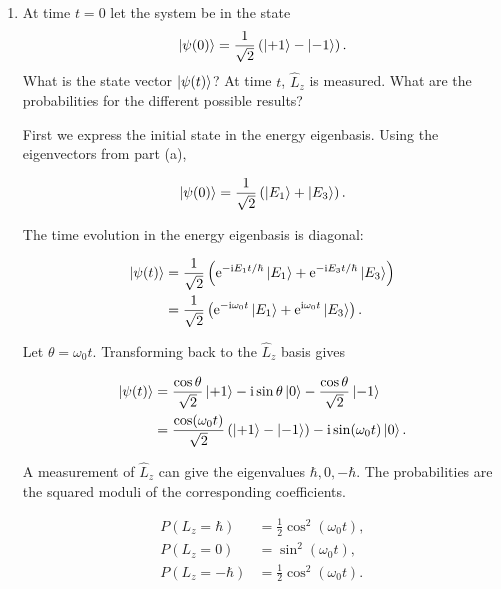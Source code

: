\documentclass[11pt,a4paper]{scrartcl}
\newcommand{\ii}{\mathrm{i}}
\newcommand{\e}{\mathrm{e}}
\newcommand{\op}[1]{\hat{#1}}
\begin{document}
\begin{enumerate}[label=(\alph*)]
        \item At time $t=0$ let the system be in the state
        \[
            \ket{\psi(0)}=\frac{1}{\sqrt{2}}\left(\ket{+1}-\ket{-1}\right).
        \]
        What is the state vector $\ket{\psi(t)}$? At time $t$, $\op{L}_z$ is measured. What are the probabilities for the different possible results?

        \begin{calculationbox}
            First we express the initial state in the energy eigenbasis. Using the eigenvectors from part (a),
            \begin{calculationbox}
                \[
                    \ket{\psi(0)}
                    =\frac{1}{\sqrt{2}}\left(\ket{E_1}+\ket{E_3}\right).
                \]
            \end{calculationbox}
            The time evolution in the energy eigenbasis is diagonal:
            \begin{calculationbox}
                \begin{align*}
                    \ket{\psi(t)}
                    &=\frac{1}{\sqrt{2}}
                    \left(\e^{-\ii E_1t/\hbar}\ket{E_1}
                    +\e^{-\ii E_3t/\hbar}\ket{E_3}\right) \\
                    &=\frac{1}{\sqrt{2}}
                    \left(\e^{-\ii\omega_0t}\ket{E_1}
                    +\e^{\ii\omega_0t}\ket{E_3}\right).
                \end{align*}
            \end{calculationbox}
            Let $\theta=\omega_0t$. Transforming back to the $\op{L}_z$ basis gives
            \begin{calculationbox}
                \begin{align*}
                    \ket{\psi(t)}
                    &=\frac{\cos\theta}{\sqrt{2}}\ket{+1}
                    -\ii\sin\theta\ket{0}
                    -\frac{\cos\theta}{\sqrt{2}}\ket{-1} \\
                    &=\frac{\cos(\omega_0t)}{\sqrt{2}}\left(\ket{+1}-\ket{-1}\right)
                    -\ii\sin(\omega_0t)\ket{0}.
                \end{align*}
            \end{calculationbox}
            A measurement of $\op{L}_z$ can give the eigenvalues $\hbar,0,-\hbar$. The probabilities are the squared moduli of the corresponding coefficients.
            \begin{calculationbox}
                \begin{align*}
                    P(L_z=\hbar) &= \frac12\cos^2(\omega_0t),\\
                    P(L_z=0) &= \sin^2(\omega_0t),\\
                    P(L_z=-\hbar) &= \frac12\cos^2(\omega_0t).
                \end{align*}
            \end{calculationbox}
        \end{calculationbox}


\end{enumerate}
\end{document}

